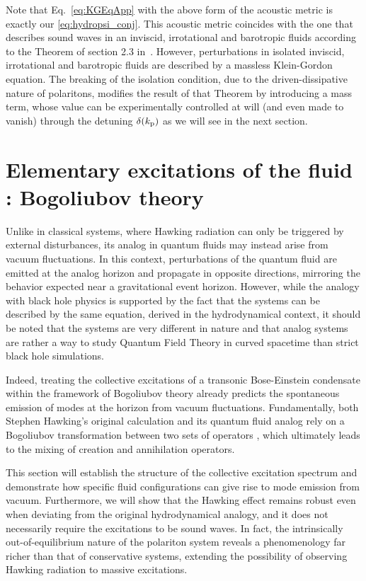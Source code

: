 Note that Eq.~\eqref{eq:KGEqApp} with the above form of the acoustic metric is exactly our \autoref{eq:hydropsi_conj}.
This acoustic metric coincides with the one that describes sound waves in an inviscid, irrotational and barotropic fluids according to the Theorem of section 2.3 in~\cite{barcelo_analogue_2011}. However, perturbations in isolated inviscid, irrotational and barotropic fluids are described by a massless Klein-Gordon equation. The breaking of the isolation condition, due to the
driven-dissipative nature of polaritons, modifies the result of that Theorem by introducing a mass term, whose value can be experimentally controlled at will (and even made to vanish) through the detuning $\delta(k_{\mathrm{p}})$ as we will see in the next section.


\section{Elementary excitations of the fluid : Bogoliubov theory}
Unlike in classical systems, where Hawking radiation can only be triggered by external disturbances, its analog in quantum fluids may instead arise from vacuum fluctuations. In this context, perturbations of the quantum fluid are emitted at the analog horizon and propagate in opposite directions, mirroring the behavior expected near a gravitational event horizon. 
However, while the analogy with black hole physics is supported by the fact that the systems can be described by the same equation, derived in the hydrodynamical context, it should be noted that the systems are very different in nature and that analog 
systems are rather a way to study Quantum Field Theory in curved spacetime than strict black hole simulations.

Indeed, treating the collective excitations of a transonic Bose-Einstein condensate within the framework of Bogoliubov theory already predicts the spontaneous emission of modes at the horizon from vacuum fluctuations. Fundamentally, both Stephen Hawking's original calculation and its quantum fluid analog rely on a Bogoliubov transformation between two sets of operators \cite{hawking_black_1972}, which ultimately leads to the mixing of creation and annihilation operators.

This section will establish the structure of the collective excitation spectrum and demonstrate how specific fluid configurations can give rise to mode emission from vacuum. Furthermore, we will show that the Hawking effect remains robust even when deviating from the original hydrodynamical analogy, and it does not necessarily require the excitations to be sound waves. 
In fact, the intrinsically out-of-equilibrium nature of the polariton system reveals a phenomenology far richer than that of conservative systems, extending the possibility of observing Hawking radiation to massive excitations.



